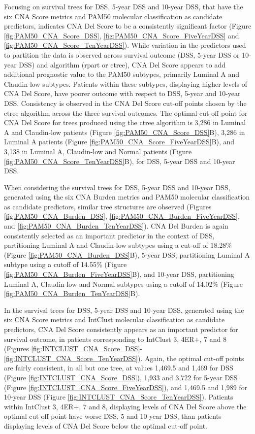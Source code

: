 Focusing on survival trees for DSS, 5-year DSS and 10-year DSS, that have the six CNA Score metrics and PAM50 molecular classification as candidate predictors, indicates CNA Del Score to be a consistently significant factor (Figure \ref{fig:PAM50_CNA_Score_DSS}, \ref{fig:PAM50_CNA_Score_FiveYearDSS} and \ref{fig:PAM50_CNA_Score_TenYearDSS}). While variation in the predictors used to partition the data is observed across survival outcome (DSS, 5-year DSS or 10-year DSS) and algorithm (rpart or ctree), CNA Del Score appears to add additional prognostic value to the PAM50 subtypes, primarily Luminal A and Claudin-low subtypes. Patients within these subtypes, displaying higher levels of CNA Del Score, have poorer outcome with respect to DSS, 5-year and 10-year DSS. Consistency is observed in the CNA Del Score cut-off points chosen by the ctree algorithm across the three survival outcomes. The optimal cut-off point for CNA Del Score for trees produced using the ctree algorithm is 3,286 in Luminal A and Claudin-low patients (Figure \ref{fig:PAM50_CNA_Score_DSS}B), 3,286 in Luminal A patients (Figure \ref{fig:PAM50_CNA_Score_FiveYearDSS}B), and 3,138 in Luminal A, Claudin-low and Normal patients (Figure \ref{fig:PAM50_CNA_Score_TenYearDSS}B), for DSS, 5-year DSS and 10-year DSS. 

When considering the survival trees for DSS, 5-year DSS and 10-year DSS, generated using the six CNA Burden metrics and PAM50 molecular classification as candidate predictors, similar tree structures are observed (Figures \ref{fig:PAM50_CNA_Burden_DSS}, \ref{fig:PAM50_CNA_Burden_FiveYearDSS}, and \ref{fig:PAM50_CNA_Burden_TenYearDSS}). CNA Del Burden is again consistently selected as an important predictor in the context of DSS, partitioning Luminal A and Claudin-low subtypes using a cut-off of 18.28\% (Figure \ref{fig:PAM50_CNA_Burden_DSS}B), 5-year DSS, partitioning Luminal A subtype using a cutoff of 14.55\% (Figure \ref{fig:PAM50_CNA_Burden_FiveYearDSS}B), and 10-year DSS, partitioning Luminal A, Claudin-low and Normal subtypes using a cutoff of 14.02\% (Figure \ref{fig:PAM50_CNA_Burden_TenYearDSS}B). 

In the survival trees for DSS, 5-year DSS and 10-year DSS, generated using the six CNA Score metrics and IntClust molecular classification as candidate predictors, CNA Del Score consistently appears as an important predictor for survival outcome, in patients corresponding to IntClust 3, 4ER+, 7 and 8 (Figures \ref{fig:INTCLUST_CNA_Score_DSS}-\ref{fig:INTCLUST_CNA_Score_TenYearDSS}). Again, the optimal cut-off points are fairly consistent, in all but one tree, at values 1,469.5 and 1,469 for DSS (Figure \ref{fig:INTCLUST_CNA_Score_DSS}), 1,933 and 3,722 for 5-year DSS (Figure \ref{fig:INTCLUST_CNA_Score_FiveYearDSS}), and 1,469.5 and 1,989 for 10-year DSS (Figure \ref{fig:INTCLUST_CNA_Score_TenYearDSS}). Patients within IntClust 3, 4ER+, 7 and 8, displaying levels of CNA Del Score above the optimal cut-off point have worse DSS, 5 and 10-year DSS, than patients displaying levels of CNA Del Score below the optimal cut-off point. 

